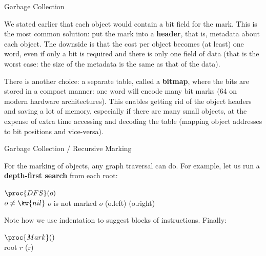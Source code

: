 \documentclass[compress,dvipdfmx]{beamer}
\begin{document}
%
\begin{frame}{Garbage Collection}

  We stated earlier that each object would contain a bit field for the
  mark. This is the most common solution: put the mark into a
  \textbf{header}, that is, metadata about each object. The downside
  is that the cost per object becomes (at least) one word, even if
  only a bit is required and there is only one field of data (that is
  the worst case: the size of the metadata is the same as that of the
  data).

  \bigskip

  There is another choice: a separate table, called a \textbf{bitmap},
  where the bits are stored in a compact manner: one word will encode
  many bit marks (64 on modern hardware architectures). This enables
  getting rid of the object headers and saving a lot of memory,
  especially if there are many small objects, at the expense of extra
  time accessing and decoding the table (mapping object addresses to
  bit positions and vice\hyp{}versa).

\end{frame}

%
\begin{frame}{Garbage Collection / Recursive Marking}

  For the marking of objects, any graph traversal can do. For example,
  let us run a \textbf{depth\hyp{}first search} from each root:

  \bigskip

  \begin{codebox}
    \(\proc{DFS}(o)\)\\
    \li \If \(o \neq \kw{nil}\)  \(o\) is not marked
    \li \Then {} \(o\)
    \li       {}(o.left)
    \li       {}(o.right)
        \End
  \end{codebox}
  Note how we use indentation to suggest blocks of
  instructions. Finally:
  \begin{codebox}
    \(\proc{Mark}()\)\\
    \li \For {} root \(r\)  (r)
  \end{codebox}

\end{frame}
\end{document}
